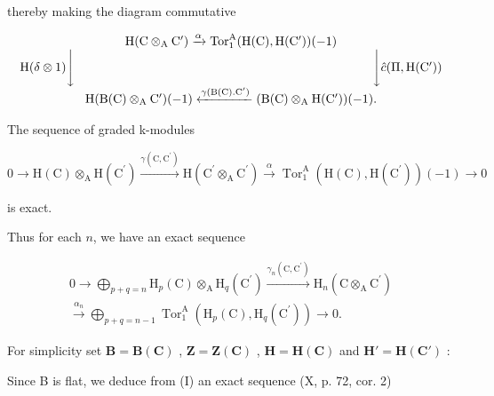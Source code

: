 thereby making the diagram commutative

\[
\begin{array}{c} \mathrm{H} (\mathrm{C} \otimes_ {\mathrm{A}} \mathrm{C} ^ {\prime}) \xrightarrow {\alpha} \operatorname{Tor} _ {1} ^ {\mathrm{A}} (\mathrm{H} (\mathrm{C}), \mathrm{H} (\mathrm{C} ^ {\prime})) (- 1) \\ \mathrm{H} (\delta \otimes 1) \Biggl \downarrow \qquad \qquad \qquad \qquad \qquad \qquad \qquad \qquad \qquad \qquad \qquad \qquad \Biggl \downarrow \hat {c} (\Pi , \mathrm{H} (\mathrm{C} ^ {\prime})) \\ \mathrm{H} (\mathrm{B} (\mathrm{C}) \otimes_ {\mathrm{A}} \mathrm{C} ^ {\prime}) (- 1) \xleftarrow {\gamma (\mathrm{B} (\mathrm{C}) . \mathrm{C} ^ {\prime})} (\mathrm{B} (\mathrm{C}) \otimes_ {\mathrm{A}} \mathrm{H} (\mathrm{C} ^ {\prime})) (- 1). \end{array}
\]

The sequence of graded k-modules

\[
0 \longrightarrow \mathrm{H} (\mathrm{C}) \otimes_ {\mathrm{A}} \mathrm{H} \left(\mathrm{C} ^ {\prime}\right) \xrightarrow {\gamma \left(\mathrm{C} , \mathrm{C} ^ {\prime}\right)} \mathrm{H} \left(\mathrm{C} ^ {\prime} \otimes_ {\mathrm{A}} \mathrm{C} ^ {\prime}\right) \xrightarrow {\alpha} \operatorname{Tor} _ {1} ^ {\mathrm{A}} \left(\mathrm{H} (\mathrm{C}), \mathrm{H} \left(\mathrm{C} ^ {\prime}\right)\right) (- 1) \longrightarrow 0
\]

is exact.

Thus for each \( n \), we have an exact sequence

\[
\begin{array}{c} 0 \longrightarrow \bigoplus_ {p + q = n} \mathrm{H} _ {p} (\mathrm{C}) \otimes_ {\mathrm{A}} \mathrm{H} _ {q} (\mathrm{C} ^ {\prime}) \xrightarrow {\gamma_ {n} (\mathrm{C} , \mathrm{C} ^ {\prime})} \mathrm{H} _ {n} (\mathrm{C} \otimes_ {\mathrm{A}} \mathrm{C} ^ {\prime}) \\ \xrightarrow {\alpha_ {n}} \bigoplus_ {p + q = n - 1} \operatorname{Tor} _ {1} ^ {\mathrm{A}} \left(\mathrm{H} _ {p} (\mathrm{C}), \mathrm{H} _ {q} (\mathrm{C} ^ {\prime})\right) \longrightarrow 0. \end{array}\tag{11}
\]

For simplicity set \(\mathbf{B} = \mathbf{B}(\mathbf{C})\) , \(\mathbf{Z} = \mathbf{Z}(\mathbf{C})\) , \(\mathbf{H} = \mathbf{H}(\mathbf{C})\) and \(\mathbf{H}' = \mathbf{H}(\mathbf{C}')\) :

Since B is flat, we deduce from (I) an exact sequence (X, p. 72, cor. 2)

